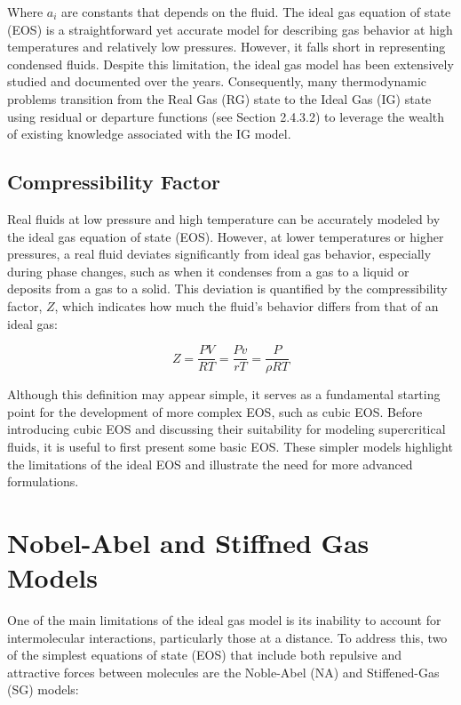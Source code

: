 	Where $a_i$ are constants that depends on the fluid. The ideal gas equation
	of state (EOS) is a straightforward yet accurate model for describing gas
	behavior at high temperatures and relatively low pressures. However, it
	falls short in representing condensed fluids. Despite this limitation, the
	ideal gas model has been extensively studied and documented over the years.
	Consequently, many thermodynamic problems transition from the Real Gas (RG)
	state to the Ideal Gas (IG) state using residual or departure functions (see
	Section 2.4.3.2) to leverage the wealth of existing knowledge associated
	with the IG model.


	\subsection{Compressibility Factor}

	Real fluids at low pressure and high temperature can be accurately modeled by
	the ideal gas equation of state (EOS). However, at lower temperatures or
	higher pressures, a real fluid deviates significantly from ideal gas
	behavior, especially during phase changes, such as when it condenses from a
	gas to a liquid or deposits from a gas to a solid. This deviation is
	quantified by the compressibility factor, $Z$, which indicates how much the
	fluid's behavior differs from that of an ideal gas:

	\begin{equation}
		Z = \frac{PV}{RT} =\frac{Pv}{rT} = \frac{P}{\rho RT} 
	\end{equation}

	Although this definition may appear simple, it serves as a fundamental
	starting point for the development of more complex EOS, such as cubic EOS.
	Before introducing cubic EOS and discussing their suitability for modeling
	supercritical fluids, it is useful to first present some basic EOS. These
	simpler models highlight the limitations of the ideal EOS and illustrate the
	need for more advanced formulations.  

\section{Nobel-Abel and Stiffned Gas Models}

One of the main limitations of the ideal gas model is its inability to account
for intermolecular interactions, particularly those at a distance. To address
this, two of the simplest equations of state (EOS) that include both repulsive
and attractive forces between molecules are the Noble-Abel (NA) and
Stiffened-Gas (SG) models:	

